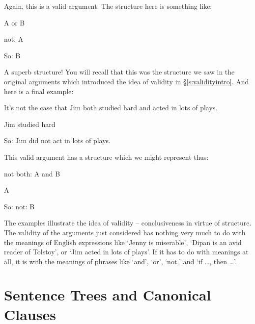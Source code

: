 Again, this is a valid argument. The structure here is something like:
	\begin{earg}
		\item[] A \textsf{or} B
		\item[] \textsf{not}: A
		\item[So:] B
	\end{earg}
A superb structure! You will recall that this was the structure we saw in the original arguments which introduced the idea of validity in §\ref{s:validityintro}. And here is a final example:
	\begin{earg}
		\item[] \textsf{It's not the case that} Jim \textsf{both} studied hard \textsf{and} acted in lots of plays.
		\item[] Jim studied hard
		\item[So:] Jim did \textsf{not} act in lots of plays.
	\end{earg}
This valid argument has a structure which we might represent thus:
	\begin{earg}
		\item[] \textsf{not both}: A \textsf{and} B
		\item[] A
		\item[So:] \textsf{not}: B
	\end{earg}
The examples illustrate the idea of validity – conclusiveness in virtue of structure. The validity of the arguments just considered has nothing very much to do with the meanings of English expressions like `Jenny is miserable', `Dipan is an avid reader of Tolstoy', or `Jim acted in lots of plays'. If it has to do with meanings at all, it is with the meanings of phrases like `and', `or', `not,' and `if …, then …'.

\section{Sentence Trees and Canonical Clauses}\label{ss.canonical}

